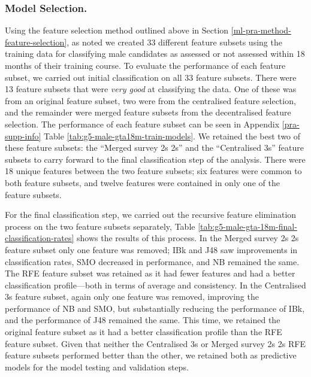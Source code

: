 \documentclass[
  12pt,
  a4paper,
]{book}
\begin{document}
\hypertarget{model-selection.-1}{%
\subsubsection{Model Selection.}\label{model-selection.-1}}

Using the feature selection method outlined above in Section \ref{ml-pra-method-feature-selection}, as noted we created 33 different feature subsets using the training data for classifying male candidates as assessed or not assessed within 18 months of their training course. To evaluate the performance of each feature subset, we carried out initial classification on all 33 feature subsets. There were 13 feature subsets that were \emph{very good} at classifying the data. One of these was from an original feature subset, two were from the centralised feature selection, and the remainder were merged feature subsets from the decentralised feature selection. The performance of each feature subset can be seen in Appendix \ref{pra-supp-info} Table \ref{tab:g5-male-gta18m-train-models}. We retained the best two of these feature subsets: the ``Merged survey 2s 2s'' and the ``Centralised 3s'' feature subsets to carry forward to the final classification step of the analysis. There were 18 unique features between the two feature subsets; six features were common to both feature subsets, and twelve features were contained in only one of the feature subsets.

For the final classification step, we carried out the recursive feature elimination process on the two feature subsets separately, Table \ref{tab:g5-male-gta-18m-final-classification-rates} shows the results of this process. In the Merged survey 2s 2s feature subset only one feature was removed; IBk and J48 saw improvements in classification rates, SMO decreased in performance, and NB remained the same. The RFE feature subset was retained as it had fewer features and had a better classification profile---both in terms of average and consistency. In the Centralised 3s feature subset, again only one feature was removed, improving the performance of NB and SMO, but substantially reducing the performance of IBk, and the performance of J48 remained the same. This time, we retained the original feature subset as it had a better classification profile than the RFE feature subset. Given that neither the Centralised 3s or Merged survey 2s 2s RFE feature subsets performed better than the other, we retained both as predictive models for the model testing and validation steps.
\end{document}
